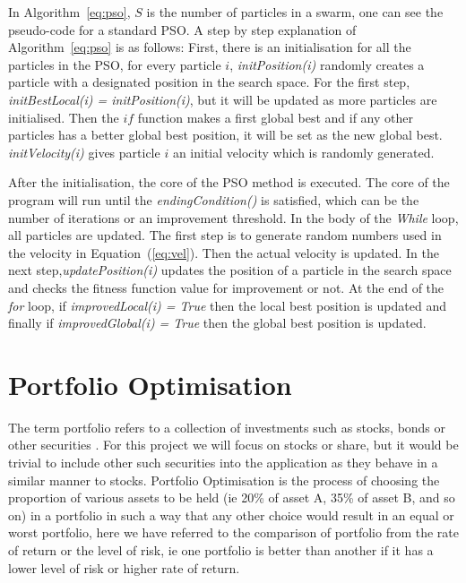   In Algorithm~\ref{eq:pso}, $S$ is the number of particles in a swarm, one can see the pseudo-code for a standard PSO. A step by step explanation of Algorithm~\ref{eq:pso} is as follows: First, there is an initialisation for all the particles in the PSO, for every particle $i$, \textit{initPosition(i)} randomly creates a particle with a designated position in the search space. For the first step, \textit{initBestLocal(i) = initPosition(i)}, but it will be updated as more particles are initialised. Then the $if$ function makes a first global best and if any other particles has a better global best position, it will be set as the new global best. \textit{initVelocity(i)} gives particle $i$ an initial velocity which is randomly generated. 

  After the initialisation, the core of the PSO method is executed. The core of the program will run until the \textit{endingCondition()} is satisfied, which can be the number of iterations or an improvement threshold. In the body of the \textit{While} loop, all particles are updated. The first step is to generate random numbers used in the velocity in Equation~(\ref{eq:vel}). Then the actual velocity is updated. In the next step,\textit{updatePosition(i)} updates the position of a particle in the search space and checks the fitness function value for improvement or not. At the end of the \textit{for} loop, if \textit{improvedLocal(i) = True} then the local best position is updated and finally if \textit{improvedGlobal(i) = True} then the global best position is updated.

  \section{Portfolio Optimisation} %
  \label{sec:portfolio_management}
  The term portfolio refers to a collection of investments such as stocks, bonds or other securities \cite{portfolio}. For this project we will focus on stocks or share, but it would be trivial to include other such securities into the application as they behave in a similar manner to stocks. Portfolio Optimisation is the process of choosing the proportion of various assets to be held (ie 20\% of asset A, 35\% of asset B, and so on) in a portfolio in such a way that any other choice would result in an equal or worst portfolio, here we have referred to the comparison of portfolio from the rate of return or the level of risk, ie one portfolio is better than another if it has a lower level of risk or higher rate of return. 

